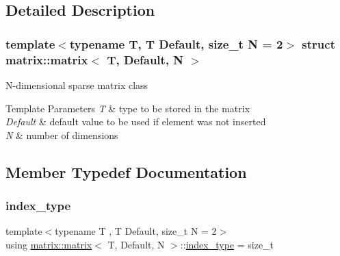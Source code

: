\subsection{Detailed Description}
\subsubsection*{template$<$typename T, T Default, size\+\_\+t N = 2$>$\newline
struct matrix\+::matrix$<$ T, Default, N $>$}

N-\/dimensional sparse matrix class 
\begin{DoxyTemplParams}{Template Parameters}
{\em T} & type to be stored in the matrix \\
\hline
{\em Default} & default value to be used if element was not inserted \\
\hline
{\em N} & number of dimensions \\
\hline
\end{DoxyTemplParams}


\subsection{Member Typedef Documentation}
\mbox{\label{structmatrix_1_1matrix_a87b61e7f35dcd5991cd3f243cfeced06}} 
\subsubsection{\texorpdfstring{index\+\_\+type}{index\_type}}
{\footnotesize\ttfamily template$<$typename T , T Default, size\+\_\+t N = 2$>$ \\
using \hyperlink{structmatrix_1_1matrix}{matrix\+::matrix}$<$ T, Default, N $>$\+::\hyperlink{structmatrix_1_1matrix_a87b61e7f35dcd5991cd3f243cfeced06}{index\+\_\+type} =  size\+\_\+t}

\mbox{\label{structmatrix_1_1matrix_a1de5c69f5d9e3b6d3e54b1e4cb433d65}} 
